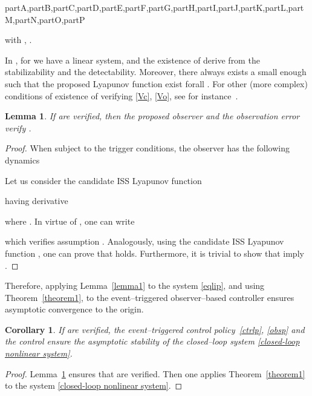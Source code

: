 \documentclass[letterpaper, 10 pt, conference]{ieeeconf}
\def\compile{partA,partB,partC,partD,partE,partF,partG,partH,partI,partJ,partK,partL,partM,partN,partO,partP}
\newenvironment{partO}[1][]{}{}
\newenvironment{partP}[1][]{}{}
\newtheorem{corollary}{Corollary}
\newtheorem{lemma}{Lemma}
\begin{document}
\begin{xcomment}{\compile}
\begin{partN}
\begin{enumerate}
with , .
\end{enumerate}


In , for  we have a linear system, and the existence of  derive from the stabilizability and the detectability. Moreover, there always exists a  small enough such that the proposed Lyapunov function exist forall . For other (more complex) conditions of existence of  verifying \eqref{Vc}, \eqref{Vo}, see for instance~\cite{Pagilla 2004}.


\medskip 
\begin{lemma}\label{lemma5}
If  are verified, then the proposed observer and the observation error verify  .
 \end{lemma}


\end{partN}
\begin{partO}


\medskip
\begin{proof}
When subject to the trigger conditions, the observer has the following dynamics

Let us consider the candidate ISS Lyapunov function

having derivative

where . In virtue of , one can write 

which verifies assumption . Analogously, using the candidate ISS Lyapunov function , one can prove that  holds. Furthermore, it is trivial to show that  imply .
\end{proof}

\end{partO}
\begin{partP}


\medskip
Therefore, applying Lemma~\ref{lemma1} to the system \eqref{eqlip}, and using Theorem~\ref{theorem1}, to the event--triggered observer--based controller ensures asymptotic convergence to the origin.


\medskip
\begin{corollary}
If  are verified, the event--triggered control policy~\eqref{ctrlp}, \eqref{obsp} and the control  ensure the asymptotic stability of the closed--loop system \eqref{closed-loop nonlinear system}.
\end{corollary}

\medskip
\begin{proof} Lemma~\ref{lemma5} ensures that  are verified. Then one applies Theorem~\ref{theorem1} to the system \eqref{closed-loop  nonlinear system}.
\end{proof}


\end{partP}
\end{xcomment}
\end{document}
